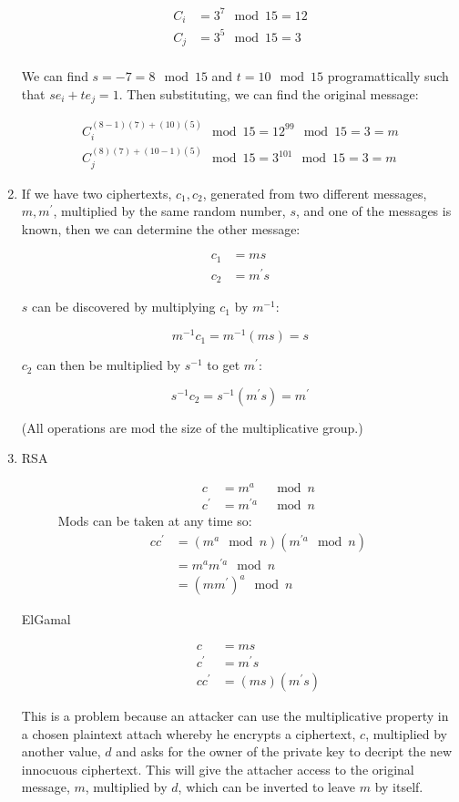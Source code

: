 \documentclass{amsart}
\begin{document}
\begin{enumerate}
\begin{align*}
C_i&=3^7\mod 15=12\\
C_j&=3^5\mod 15=3\\
\end{align*}

We can find $s=-7=8\mod 15$ and $t=10\mod 15$ programattically such that $se_i+te_j=1$.  Then substituting, we can find the original message:

\begin{align*}
C_i^{(8-1)(7)+(10)(5)}\mod 15=12^{99}\mod 15=3=m\\
C_j^{(8)(7)+(10-1)(5)}\mod 15=3^{101}\mod 15=3=m
\end{align*}

\item If we have two ciphertexts, $c_1, c_2$, generated from two different messages, $m, m^\prime$, multiplied by the same random number, $s$, and one of the messages is known, then we can determine the other message:

\begin{align*}
c_1&=ms\\
c_2&=m^\prime s
\end{align*}

$s$ can be discovered by multiplying $c_1$ by $m^{-1}$:

$$
m^{-1}c_1=m^{-1}(ms)=s
$$

$c_2$ can then be multiplied by $s^{-1}$ to get $m^\prime$:

$$
s^{-1}c_2=s^{-1}(m^\prime s)=m^\prime
$$

(All operations are mod the size of the multiplicative group.)
\item
\begin{description}
\item[RSA]
\begin{align*}
c&=m^a&\mod n\\
c^\prime&=m^{\prime a}&\mod n
\end{align*}
Mods can be taken at any time so:
\begin{align*}
cc^\prime&=(m^a\mod n)(m^{\prime a}\mod n)\\
&=m^a m^{\prime a}\mod n\\
&=(mm^\prime)^a\mod n
\end{align*}
\item[ElGamal]
\begin{align*}
c&=ms\\
c^\prime&=m^\prime s\\
cc^\prime&=(ms)(m^\prime s)
\end{align*}
\end{description}

This is a problem because an attacker can use the multiplicative property in a chosen plaintext attach whereby he encrypts a ciphertext, $c$, multiplied by another value, $d$ and asks for the owner of the private key to decript the new innocuous ciphertext.  This will give the attacher access to the original message, $m$, multiplied by $d$, which can be inverted to leave $m$ by itself.
\end{enumerate}
\end{document}
